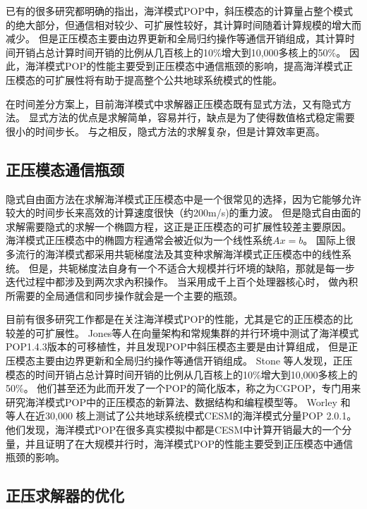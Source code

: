 已有的很多研究都明确的指出，海洋模式POP中，斜压模态的计算量占整个模式的绝大部分，但通信相对较少、可扩展性较好，其计算时间随着计算规模的增大而减少。
但是正压模态主要由边界更新和全局归约操作等通信开销组成，其计算时间开销占总计算时间开销的比例从几百核上的10\%增大到10,000多核上的50\%\cite{pop05,stone2011cgpop,Worley:2011:PCE:2063384.2063457, dennis2012computational}。
因此，海洋模式POP的性能主要受到正压模态中通信瓶颈的影响，提高海洋模式正压模态的可扩展性将有助于提高整个公共地球系统模式的性能。

在时间差分方案上，目前海洋模式中求解器正压模态既有显式方法，又有隐式方法\cite{griffies2000developments}。 
显式方法的优点是求解简单，容易并行，缺点是为了使得数值格式稳定需要很小的时间步长。
与之相反，隐式方法的求解复杂，但是计算效率更高。 
 

\subsection{正压模态通信瓶颈}
\label{related:bottleneck}

隐式自由面方法在求解海洋模式正压模态中是一个很常见的选择，因为它能够允许较大的时间步长来高效的计算速度很快（约200m/s)的重力波。
但是隐式自由面的求解需要隐式的求解一个椭圆方程，这正是正压模态的可扩展性较差主要原因。 
海洋模式正压模态中的椭圆方程通常会被近似为一个线性系统$Ax=b$。 
国际上很多流行的海洋模式都采用共轭梯度法及其变种求解海洋模式正压模态中的线性系统\citep{adcroft2014mitgcm,lai2010nonhydrostatic,madec1997ocean}。
但是，共轭梯度法自身有一个不适合大规模并行坏境的缺陷，那就是每一步迭代过程中都涉及到两次求內积操作。 
当采用成千上百个处理器核心时， 做內积所需要的全局通信和同步操作就会是一个主要的瓶颈。

目前有很多研究工作都是在关注海洋模式POP的性能，尤其是它的正压模态的比较差的可扩展性。 
Jones\cite{pop05}等人在向量架构和常规集群的并行环境中测试了海洋模式POP1.4.3版本的可移植性，并且发现POP中斜压模态主要是由计算组成， 但是正压模态主要由边界更新和全局归约操作等通信开销组成。
Stone  \cite{stone2011cgpop}等人发现，正压模态的时间开销占总计算时间开销的比例从几百核上的10\%增大到10,000多核上的50\%。 
他们甚至还为此而开发了一个POP的简化版本，称之为CGPOP，专门用来研究海洋模式POP中的正压模态的新算法、数据结构和编程模型等。 
Worley  \cite{Worley:2011:PCE:2063384.2063457} 和 \cite{dennis2012computational} 等人在近30,000 核上测试了公共地球系统模式CESM的海洋模式分量POP 2.0.1。 
他们发现，海洋模式POP在很多真实模拟中都是CESM中计算开销最大的一个分量，并且证明了在大规模并行时，海洋模式POP的性能主要受到正压模态中通信瓶颈的影响。 

\subsection{正压求解器的优化}
\label{related:improve}


